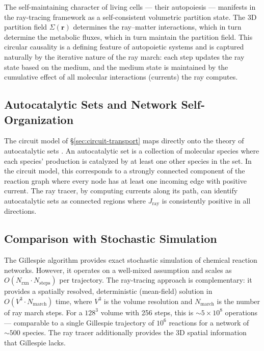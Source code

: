 \documentclass[11pt,twocolumn,a4paper]{article}
\newcommand{\Jray}{J_{\mathrm{ray}}}
\begin{document}
The self-maintaining character of living cells --- their autopoiesis
\citep{varelamaturana1980} --- manifests in the ray-tracing framework
as a self-consistent volumetric partition state. The 3D partition field
$\Sigma(\mathbf{r})$ determines the ray--matter interactions, which in
turn determine the metabolic fluxes, which in turn maintain the
partition field. This circular causality is a defining feature of
autopoietic systems and is captured naturally by the iterative nature
of the ray march: each step updates the ray state based on the medium,
and the medium state is maintained by the cumulative effect of all
molecular interactions (currents) the ray computes.

\subsection{Autocatalytic Sets and Network Self-Organization}

The circuit model of \S\ref{sec:circuit-transport} maps directly onto
the theory of autocatalytic sets \citep{kauffman1986}. An autocatalytic
set is a collection of molecular species where each species'
production is catalyzed by at least one other species in the set.
In the circuit model, this corresponds to a strongly connected
component of the reaction graph where every node has at least one
incoming edge with positive current. The ray tracer, by computing
currents along its path, can identify autocatalytic sets as connected
regions where $\Jray$ is consistently positive in all directions.

\subsection{Comparison with Stochastic Simulation}

The Gillespie algorithm \citep{gillespie1977} provides exact
stochastic simulation of chemical reaction networks. However, it
operates on a well-mixed assumption and scales as $O(N_{\mathrm{rxn}}
\cdot N_{\mathrm{steps}})$ per trajectory. The ray-tracing approach
is complementary: it provides a spatially resolved, deterministic
(mean-field) solution in $O(V^3 \cdot N_{\mathrm{march}})$ time,
where $V^3$ is the volume resolution and $N_{\mathrm{march}}$ is the
number of ray march steps. For a $128^3$ volume with 256 steps, this
is $\sim\!5 \times 10^8$ operations --- comparable to a single
Gillespie trajectory of $10^6$ reactions for a network of $\sim\!500$
species. The ray tracer additionally provides the 3D spatial
information that Gillespie lacks.
\end{document}
